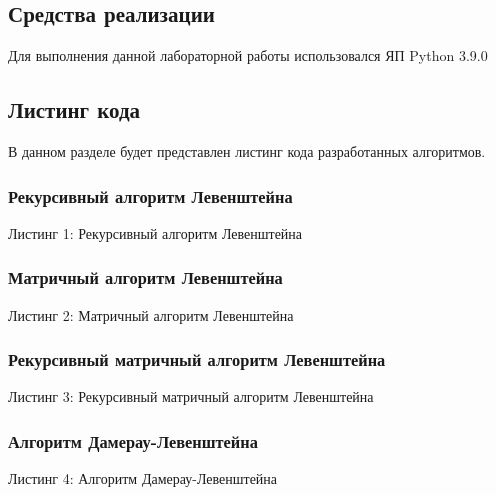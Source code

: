\documentclass[12pt,a4paper]{article}
\begin{document}
\subsection{Средства реализации}
Для выполнения данной лабораторной работы использовался ЯП Python 3.9.0 \\
\subsection{Листинг кода}
В данном разделе будет представлен листинг кода разработанных алгоритмов.\\

\subsubsection{Рекурсивный алгоритм Левенштейна}
\begin{flushleft}
	Листинг 1: Рекурсивный алгоритм Левенштейна
	
\end{flushleft}
\clearpage

\subsubsection{Матричный алгоритм Левенштейна}
\begin{flushleft}
	Листинг 2: Матричный алгоритм Левенштейна
	
\end{flushleft}

\subsubsection{Рекурсивный матричный алгоритм Левенштейна}
\begin{flushleft}
	Листинг 3: Рекурсивный матричный алгоритм Левенштейна
	
\end{flushleft}
\clearpage

\subsubsection{Алгоритм Дамерау-Левенштейна}
\begin{flushleft}
	Листинг 4: Алгоритм Дамерау-Левенштейна
	
\end{flushleft}
\clearpage
\end{document}
